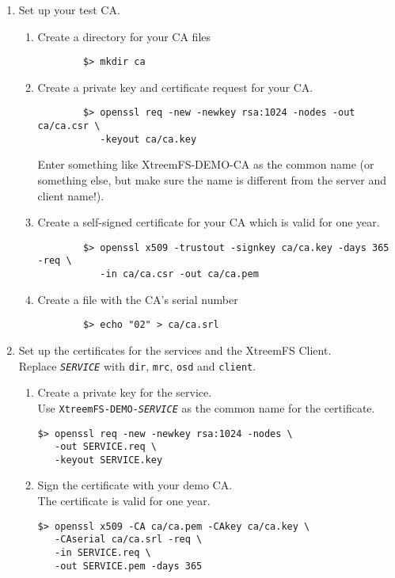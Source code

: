 \documentclass[a4paper,10pt]{book}
\begin{document}
\begin{enumerate}
 \item Set up your test CA.
	\begin{enumerate}
	\item Create a directory for your CA files
		\begin{verbatim}
		$> mkdir ca
		\end{verbatim}

	\item Create a private key and certificate request for your CA.
		\begin{verbatim}
		$> openssl req -new -newkey rsa:1024 -nodes -out ca/ca.csr \
		   -keyout ca/ca.key
		\end{verbatim}

		Enter something like XtreemFS-DEMO-CA as the common name (or something else, but make sure the name is different from the server and client name!).
	\item Create a self-signed certificate for your CA which is valid for one year.
		\begin{verbatim}
		$> openssl x509 -trustout -signkey ca/ca.key -days 365 -req \
		   -in ca/ca.csr -out ca/ca.pem
		\end{verbatim}

	\item Create a file with the CA's serial number
		\begin{verbatim}
		$> echo "02" > ca/ca.srl
		\end{verbatim}

 \end{enumerate}
 \item Set up the certificates for the services and the XtreemFS Client.\\
	Replace \texttt{\textit{SERVICE}} with \texttt{dir}, \texttt{mrc}, \texttt{osd} and \texttt{client}.
	\begin{enumerate}
	\item Create a private key for the service.\\
	      Use \texttt{XtreemFS-DEMO-\textit{SERVICE}} as the common name for the certificate.
		\begin{verbatim}
$> openssl req -new -newkey rsa:1024 -nodes \
   -out SERVICE.req \
   -keyout SERVICE.key
		\end{verbatim}

	\item Sign the certificate with your demo CA.\\
		The certificate is valid for one year.
		\begin{verbatim}
$> openssl x509 -CA ca/ca.pem -CAkey ca/ca.key \
   -CAserial ca/ca.srl -req \
   -in SERVICE.req \
   -out SERVICE.pem -days 365
		\end{verbatim}


\end{enumerate}
\end{enumerate}
\end{document}
